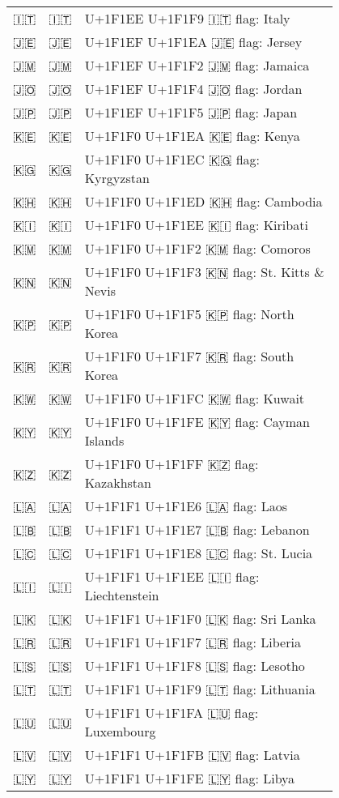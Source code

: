 \documentclass[a4paper,12pt]{article}
\newcommand{\fontA}[1]{{\fontspec[RawFeature={mode=harf,+dist,+ccmp}]{Segoe UI Emoji} #1}}
\newcommand{\fontB}[1]{{\fontspec[RawFeature={mode=harf,+dist,+ccmp}]{Noto Color Emoji} #1}}
\begin{document}
\begin{longtable}[c]{ccp{0.8\linewidth}}
\fontA{🇮🇹}&\fontB{🇮🇹}&U+1F1EE U+1F1F9 🇮🇹 flag: Italy\\
\fontA{🇯🇪}&\fontB{🇯🇪}&U+1F1EF U+1F1EA 🇯🇪 flag: Jersey\\
\fontA{🇯🇲}&\fontB{🇯🇲}&U+1F1EF U+1F1F2 🇯🇲 flag: Jamaica\\
\fontA{🇯🇴}&\fontB{🇯🇴}&U+1F1EF U+1F1F4 🇯🇴 flag: Jordan\\
\fontA{🇯🇵}&\fontB{🇯🇵}&U+1F1EF U+1F1F5 🇯🇵 flag: Japan\\
\fontA{🇰🇪}&\fontB{🇰🇪}&U+1F1F0 U+1F1EA 🇰🇪 flag: Kenya\\
\fontA{🇰🇬}&\fontB{🇰🇬}&U+1F1F0 U+1F1EC 🇰🇬 flag: Kyrgyzstan\\
\fontA{🇰🇭}&\fontB{🇰🇭}&U+1F1F0 U+1F1ED 🇰🇭 flag: Cambodia\\
\fontA{🇰🇮}&\fontB{🇰🇮}&U+1F1F0 U+1F1EE 🇰🇮 flag: Kiribati\\
\fontA{🇰🇲}&\fontB{🇰🇲}&U+1F1F0 U+1F1F2 🇰🇲 flag: Comoros\\
\fontA{🇰🇳}&\fontB{🇰🇳}&U+1F1F0 U+1F1F3 🇰🇳 flag: St. Kitts \& Nevis\\
\fontA{🇰🇵}&\fontB{🇰🇵}&U+1F1F0 U+1F1F5 🇰🇵 flag: North Korea\\
\fontA{🇰🇷}&\fontB{🇰🇷}&U+1F1F0 U+1F1F7 🇰🇷 flag: South Korea\\
\fontA{🇰🇼}&\fontB{🇰🇼}&U+1F1F0 U+1F1FC 🇰🇼 flag: Kuwait\\
\fontA{🇰🇾}&\fontB{🇰🇾}&U+1F1F0 U+1F1FE 🇰🇾 flag: Cayman Islands\\
\fontA{🇰🇿}&\fontB{🇰🇿}&U+1F1F0 U+1F1FF 🇰🇿 flag: Kazakhstan\\
\fontA{🇱🇦}&\fontB{🇱🇦}&U+1F1F1 U+1F1E6 🇱🇦 flag: Laos\\
\fontA{🇱🇧}&\fontB{🇱🇧}&U+1F1F1 U+1F1E7 🇱🇧 flag: Lebanon\\
\fontA{🇱🇨}&\fontB{🇱🇨}&U+1F1F1 U+1F1E8 🇱🇨 flag: St. Lucia\\
\fontA{🇱🇮}&\fontB{🇱🇮}&U+1F1F1 U+1F1EE 🇱🇮 flag: Liechtenstein\\
\fontA{🇱🇰}&\fontB{🇱🇰}&U+1F1F1 U+1F1F0 🇱🇰 flag: Sri Lanka\\
\fontA{🇱🇷}&\fontB{🇱🇷}&U+1F1F1 U+1F1F7 🇱🇷 flag: Liberia\\
\fontA{🇱🇸}&\fontB{🇱🇸}&U+1F1F1 U+1F1F8 🇱🇸 flag: Lesotho\\
\fontA{🇱🇹}&\fontB{🇱🇹}&U+1F1F1 U+1F1F9 🇱🇹 flag: Lithuania\\
\fontA{🇱🇺}&\fontB{🇱🇺}&U+1F1F1 U+1F1FA 🇱🇺 flag: Luxembourg\\
\fontA{🇱🇻}&\fontB{🇱🇻}&U+1F1F1 U+1F1FB 🇱🇻 flag: Latvia\\
\fontA{🇱🇾}&\fontB{🇱🇾}&U+1F1F1 U+1F1FE 🇱🇾 flag: Libya\\

\end{longtable}
\end{document}
